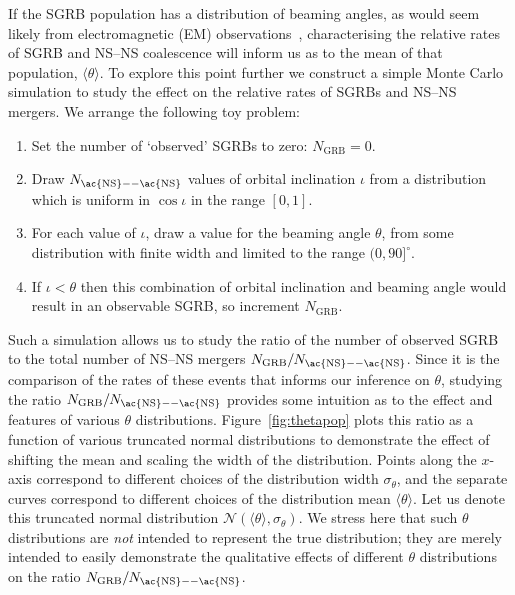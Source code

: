 \documentclass[twocolumn]{aastex61}
\newcommand{\BNS}{\ac{NS}--\ac{NS}\xspace}
\def\electro#1{electromagnetic#1 (EM#1)\gdef\electro{EM}}
\begin{document}
If the \ac{SGRB} population has a distribution of beaming angles, as would seem
likely from \electro{} observations~\cite{Fong:2015oha}, characterising the
relative rates of \ac{SGRB} and \BNS coalescence will inform us as to the mean
of that population, $\langle \theta \rangle$.  To explore this point further we
construct a simple Monte Carlo simulation to study the effect on the relative
rates of \acp{SGRB} and \BNS mergers. We arrange the following toy problem:
%
\begin{enumerate}
    \item Set the number of `observed' \acp{SGRB} to zero: $N_{\mathrm{GRB}}=0$.
    \item Draw $N_{\mathrm{\BNS}}$ values of orbital inclination $\iota$ from a distribution which is uniform in $\cos \iota$ in the range $[0,1]$.
    \item For each value of $\iota$, draw a value for the beaming angle $\theta$, from some distribution with finite width and limited to the range $(0,90]^{\circ}$.
    \item If $\iota<\theta$ then this combination of orbital inclination and beaming angle would result in an observable \ac{SGRB}, so increment $N_{\mathrm{GRB}}$.
\end{enumerate}
%
Such a simulation allows us to study the ratio of the number of
observed \ac{SGRB} to the total number of \BNS mergers
$N_{\mathrm{GRB}}/N_{\mathrm{\BNS}}$.  Since it is the comparison of
the rates of these events that informs our inference on $\theta$,
studying the ratio $N_{\mathrm{GRB}}/N_{\mathrm{\BNS}}$ provides some
intuition as to the effect and features of various $\theta$
distributions.  Figure~\ref{fig:thetapop} plots this ratio as a
function of various truncated normal distributions to demonstrate the
effect of shifting the mean and scaling the width of the distribution.
Points along the $x$-axis correspond to different choices of the
distribution width $\sigma_{\theta}$, and the separate curves
correspond to different choices of the distribution mean
$\langle \theta \rangle$.  Let us denote this truncated normal
distribution ${\mathcal N}(\langle \theta \rangle, \sigma_{\theta})$.
We stress here that such $\theta$ distributions are \emph{not}
intended to represent the true distribution; they are merely intended
to easily demonstrate the qualitative effects of different $\theta$
distributions on the ratio $N_{\mathrm{GRB}}/N_{\mathrm{\BNS}}$.
\end{document}
